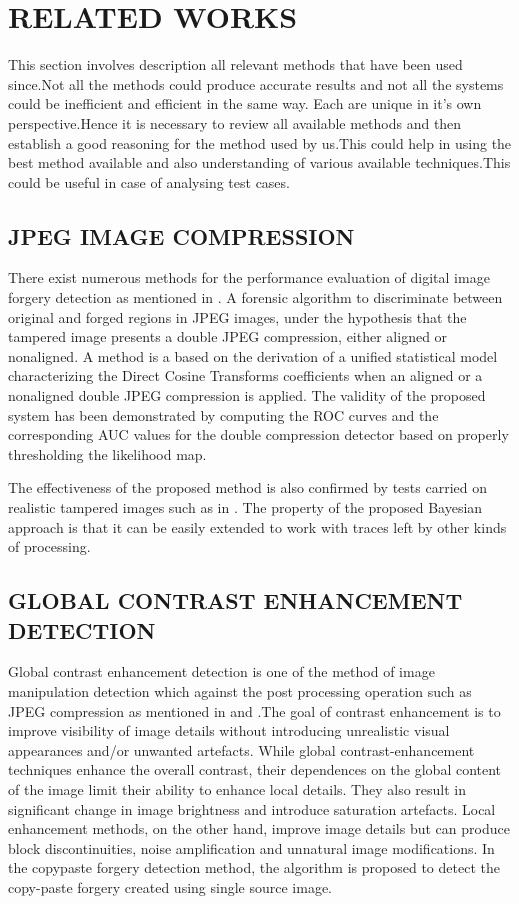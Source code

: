 \chapter{RELATED WORKS} %
This section involves description all relevant methods that have been used since.Not all the methods could produce accurate results and not all the systems could be inefficient and efficient in the same way. Each are unique in it's own perspective.Hence it is necessary to review all available methods and then establish a good reasoning for the method used by us.This could help in using the best method available and also understanding of various available techniques.This could be useful in case of analysing test cases.
    
\bigskip
\section{JPEG IMAGE COMPRESSION}
There exist numerous methods for the performance evaluation of digital image forgery detection as mentioned in \cite{anto}. A forensic algorithm to discriminate between original and forged regions in JPEG images, under the hypothesis that the tampered image presents a double JPEG compression, either aligned or nonaligned. A method is a based on the derivation of a unified statistical model characterizing the Direct Cosine Transforms coefficients when an aligned or a nonaligned double JPEG compression is applied. The validity of the proposed system has been demonstrated by computing the ROC curves and the corresponding AUC values for the double compression detector based on properly thresholding the likelihood map. 
\newline

\bigskip
The effectiveness of the proposed method is also confirmed by tests carried on realistic tampered images such as in \cite{qure}. The property of the proposed Bayesian approach is that it can be easily extended to work with traces left by other kinds of processing.
\section{GLOBAL CONTRAST ENHANCEMENT DETECTION}
Global contrast enhancement detection is one of the method of image manipulation detection which against the post processing operation such as JPEG compression as mentioned in \cite{charpe} and \cite{amina}.The goal of contrast enhancement is to improve visibility of image details without introducing unrealistic visual appearances and/or unwanted artefacts. While global contrast-enhancement techniques enhance the overall contrast, their dependences on the global content of the image limit their ability to enhance local details. They also result in significant change in image brightness and introduce saturation artefacts. Local enhancement methods, on the other hand, improve image details but can produce block discontinuities, noise amplification and unnatural image modifications. In the copypaste forgery detection method, the algorithm is proposed to detect the copy-paste forgery created using single source image.

